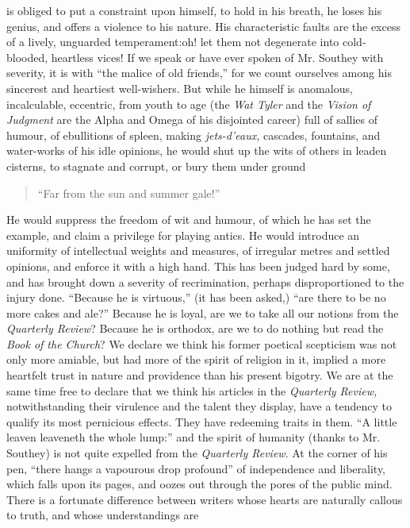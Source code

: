 is obliged to put a constraint upon himself, to hold in his
breath, he loses his genius, and offers a violence to his
nature. His characteristic faults are the excess of a lively,
unguarded temperament:\textemdash oh! let them not degenerate into
cold-blooded, heartless vices! If we speak or have ever spoken of
Mr. Southey with severity, it is with ``the malice of old
friends,'' for we count ourselves among his sincerest and
heartiest well-wishers. But while he himself is anomalous,
incalculable, eccentric, from youth to age (the \emph{Wat Tyler}
and the \emph{Vision of Judgment} are the Alpha and Omega of his
disjointed career) full of sallies of humour, of ebullitions of
spleen, making \emph{jets-d'eaux,} cascades, fountains, and
water-works of his idle opinions, he would shut up the wits of
others in leaden cisterns, to stagnate and corrupt, or bury them
under ground\textemdash
\begin{quote}
  ``Far from the sun and summer gale!''
\end{quote}
He would suppress the freedom of wit and humour, of which he has
set the example, and claim a privilege for playing antics. He
would introduce an uniformity of intellectual weights and
measures, of irregular metres and settled opinions, and enforce it
with a high hand. This has been judged hard by some, and has
brought down a severity of recrimination, perhaps disproportioned
to the injury done. ``Because he is virtuous,'' (it has been
asked,) ``are there to be no more cakes and ale?'' Because he is
loyal, are we to take all our notions from the \emph{Quarterly
  Review}?  Because he is orthodox, are we to do nothing but read
the \emph{Book of the Church}? We declare we think his former
poetical scepticism was not only more amiable, but had more of the
spirit of religion in it, implied a more heartfelt trust in nature
and providence than his present bigotry.  We are at the same time
free to declare that we think his articles in the \emph{Quarterly
  Review,} notwithstanding their virulence and the talent they
display, have a tendency to qualify its most pernicious effects.
They have redeeming traits in them. ``A little leaven leaveneth
the whole lump:'' and the spirit of humanity (thanks to
Mr. Southey) is not quite expelled from the \emph{Quarterly
  Review}. At the corner of his pen, ``there hangs a vapourous
drop profound'' of independence and liberality, which falls upon
its pages, and oozes out through the pores of the public
mind. There is a fortunate difference between writers whose hearts
are naturally callous to truth, and whose understandings are
